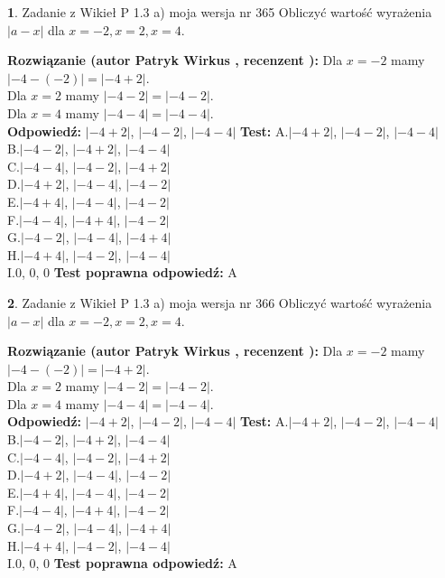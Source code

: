 \documentclass[12pt, a4paper]{article}
\theoremstyle{definition} %
\newtheorem{zad}{}
\newcommand{\zadStart}[1]{\begin{zad}#1\newline}
\newcommand{\zadStop}{\end{zad}}
\newcommand{\rozwStart}[2]{\noindent \textbf{Rozwiązanie (autor #1 , recenzent #2): }\newline}
\newcommand{\rozwStop}{\newline}
\newcommand{\odpStart}{\noindent \textbf{Odpowiedź:}\newline}
\newcommand{\odpStop}{\newline}
\newcommand{\testStart}{\noindent \textbf{Test:}\newline}
\newcommand{\testStop}{\newline}
\newcommand{\kluczStart}{\noindent \textbf{Test poprawna odpowiedź:}\newline}
\newcommand{\kluczStop}{\newline}
\begin{document}
\zadStart{Zadanie z Wikieł P 1.3 a) moja wersja nr 365}
Obliczyć wartość wyrażenia $|a - x|$ dla $x=-2,x=2,x=4$.
\zadStop
\rozwStart{Patryk Wirkus}{}
Dla $x = -2$ mamy $|-4 - (-2)| = |-4 + 2|$.\\
Dla $x = 2$ mamy $|-4 - 2| = |-4 - 2|$.\\
Dla $x = 4$ mamy $|-4 - 4| = |-4 - 4|$.\\
\rozwStop
\odpStart
$|-4 + 2|$, $|-4 - 2|$, $|-4 - 4|$
\odpStop
\testStart
A.$|-4 + 2|$, $|-4 - 2|$, $|-4 - 4|$\\
B.$|-4 - 2|$, $|-4 + 2|$, $|-4 - 4|$\\
C.$|-4 - 4|$, $|-4 - 2|$, $|-4 + 2|$\\
D.$|-4 + 2|$, $|-4 - 4|$, $|-4 - 2|$\\
E.$|-4 + 4|$, $|-4 - 4|$, $|-4 - 2|$\\
F.$|-4 - 4|$, $|-4 + 4|$, $|-4 - 2|$\\
G.$|-4 - 2|$, $|-4 - 4|$, $|-4 + 4|$\\
H.$|-4 + 4|$, $|-4 - 2|$, $|-4 - 4|$\\
I.$0$, $0$, $0$
\testStop
\kluczStart
A
\kluczStop



\zadStart{Zadanie z Wikieł P 1.3 a) moja wersja nr 366}
Obliczyć wartość wyrażenia $|a - x|$ dla $x=-2,x=2,x=4$.
\zadStop
\rozwStart{Patryk Wirkus}{}
Dla $x = -2$ mamy $|-4 - (-2)| = |-4 + 2|$.\\
Dla $x = 2$ mamy $|-4 - 2| = |-4 - 2|$.\\
Dla $x = 4$ mamy $|-4 - 4| = |-4 - 4|$.\\
\rozwStop
\odpStart
$|-4 + 2|$, $|-4 - 2|$, $|-4 - 4|$
\odpStop
\testStart
A.$|-4 + 2|$, $|-4 - 2|$, $|-4 - 4|$\\
B.$|-4 - 2|$, $|-4 + 2|$, $|-4 - 4|$\\
C.$|-4 - 4|$, $|-4 - 2|$, $|-4 + 2|$\\
D.$|-4 + 2|$, $|-4 - 4|$, $|-4 - 2|$\\
E.$|-4 + 4|$, $|-4 - 4|$, $|-4 - 2|$\\
F.$|-4 - 4|$, $|-4 + 4|$, $|-4 - 2|$\\
G.$|-4 - 2|$, $|-4 - 4|$, $|-4 + 4|$\\
H.$|-4 + 4|$, $|-4 - 2|$, $|-4 - 4|$\\
I.$0$, $0$, $0$
\testStop
\kluczStart
A
\kluczStop
\end{document}
